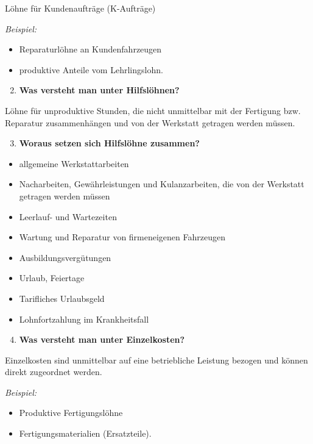 Löhne für Kundenaufträge (K-Aufträge)

\emph{Beispiel:}

\begin{itemize}
\item
  Reparaturlöhne an Kundenfahrzeugen
\item
  produktive Anteile vom Lehrlingslohn.
\end{itemize}

\begin{enumerate}
\setcounter{enumi}{1}
\item
  \textbf{Was versteht man unter Hilfslöhnen?}
\end{enumerate}

Löhne für unproduktive Stunden, die nicht unmittelbar mit der Fertigung
bzw. Reparatur zusammenhängen und von der Werkstatt getragen werden
müssen.

\begin{enumerate}
\setcounter{enumi}{2}
\item
  \textbf{Woraus setzen sich Hilfslöhne zusammen?}
\end{enumerate}

\begin{itemize}
\item
  allgemeine Werkstattarbeiten
\item
  Nacharbeiten, Gewährleistungen und Kulanzarbeiten, die von der
  Werkstatt getragen werden müssen
\item
  Leerlauf- und Wartezeiten
\item
  Wartung und Reparatur von firmeneigenen Fahrzeugen
\item
  Ausbildungsvergütungen
\item
  Urlaub, Feiertage
\item
  Tarifliches Urlaubsgeld
\item
  Lohnfortzahlung im Krankheitsfall
\end{itemize}

\begin{enumerate}
\setcounter{enumi}{3}
\item
  \textbf{Was versteht man unter Einzelkosten?}
\end{enumerate}

Einzelkosten sind unmittelbar auf eine betriebliche Leistung bezogen und
können direkt zugeordnet werden.

\emph{Beispiel:}

\begin{itemize}
\item
  Produktive Fertigungslöhne
\item
  Fertigungsmaterialien (Ersatzteile).
\end{itemize}

